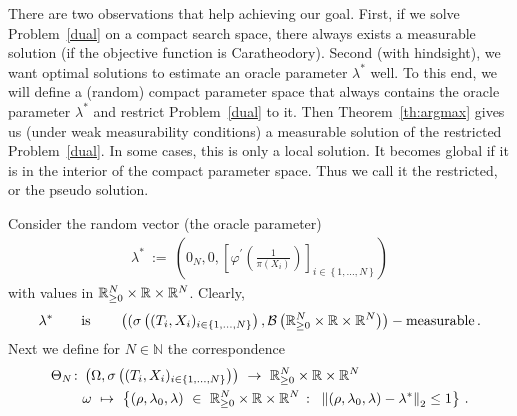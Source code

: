 There are two observations that help achieving our goal.
First, if we solve Problem~\ref{dual} on a compact search space, there always exists a measurable solution (if the objective function is Caratheodory).
Second (with hindsight), we want optimal solutions to estimate an oracle parameter $\lambda^*$ well. 
To this end, we will define a (random) compact parameter space that always contains the oracle parameter $\lambda^*$ and restrict Problem~\ref{dual} to it.
Then Theorem~\ref{th:argmax} gives us (under weak measurability conditions) a measurable solution of the restricted Problem~\ref{dual}.
In some cases, this is only a local solution. It becomes global if it is in the interior of the compact parameter space.
Thus we call it the restricted, or the pseudo solution.

Consider 
the random vector (the oracle parameter)
\begin{align*}
  \lambda^*
  \ 
  :=
  \ 
  \left(
  0_{N},0,
  \left[
  \varphi^{'}
  \left(
  \frac
  {1}
  {\pi(X_i)}
  \right)
\right]_{i\in \left\{
  1,\ldots,N
\right\}}
  \right)
\end{align*}
with values in 
$\mathbb{R}^N_{\ge 0}\times \mathbb{R}\times \mathbb{R}^N$.
Clearly,  
\begin{align*}
 \lambda^*
 \qquad
 \text{is}
 \qquad
 \left(
( 
\sigma
\left( 
  (T_i,X_i)_{i\in 
\left\{ 1,\ldots,N \right\}
  } 
\right)
,
\mathcal{B}
\left( 
\mathbb{R}^N_{\ge 0}\times \mathbb{R}\times \mathbb{R}^N
\right)
\right)
-\text{measurable}
\,.
\end{align*}
Next we define for $N\in\mathbb{N}$ the correspondence  
\begin{align*}
  \Theta_N\colon
  &
  \left( 
  \Omega,
\sigma
\left( 
  (T_i,X_i)_{i\in 
\left\{ 1,\ldots,N \right\}
  } 
\right)
  \right)
  \ 
\to
  \ 
\R^N_{\ge 0}\times \R\times \R^N
\\
&
\omega
  \ 
\mapsto
  \ 
\left\{ 
  \left( 
  \rho,\lambda_0,\lambda
  \right)
  \ 
  \in
  \ 
\R^N_{\ge 0}\times \R\times \R^N
  \ 
\colon
  \ 
\norm{
  \left( 
  \rho,\lambda_0,\lambda
  \right)
-\lambda^*}_2\le 1
\right\}
\,.
\end{align*}

